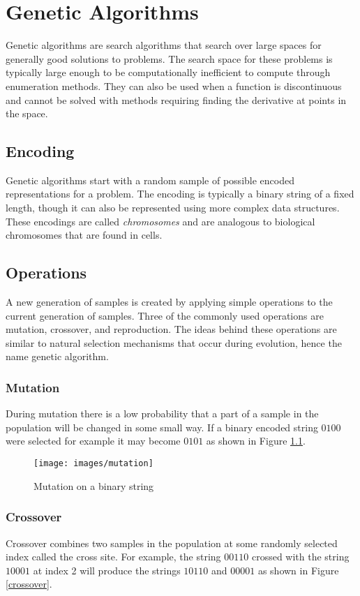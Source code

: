 \chapter[Genetic Algorithms]{Genetic Algorithms}
Genetic algorithms are search algorithms that search over large spaces for generally good solutions to problems.
The search space for these problems is typically large enough to be computationally inefficient to compute through enumeration methods.
They can also be used when a function is discontinuous and cannot be solved with methods requiring finding the derivative at points in the space. 

\section{Encoding}
Genetic algorithms start with a random sample of possible encoded representations for a problem.
The encoding is typically a binary string of a fixed length, though it can also be represented using more complex data structures.
These encodings are called {\it chromosomes} and are analogous to biological chromosomes that are found in cells.

\section{Operations}
A new generation of samples is created by applying simple operations to the current generation of samples. 
Three of the commonly used operations are mutation, crossover, and reproduction.
The ideas behind these operations are similar to natural selection mechanisms that occur during evolution, hence the name genetic algorithm. 

\subsection{Mutation}
During mutation there is a low probability that a part of a sample in the population will be changed in some small way. 
If a binary encoded string $0100$ were selected for example it may become $0101$ as shown in Figure \ref{mutation}.

\begin{figure}[h!]
  \centering
  \texttt{[image: images/mutation]}
  \caption{Mutation on a binary string}
  \label{mutation}
\end{figure}

\subsection{Crossover}
Crossover combines two samples in the population at some randomly selected index called the cross site. 
For example, the string $00110$ crossed with the string $10001$ at index 2 will produce the strings $10110$ and $00001$ as shown in Figure \ref{crossover}.

